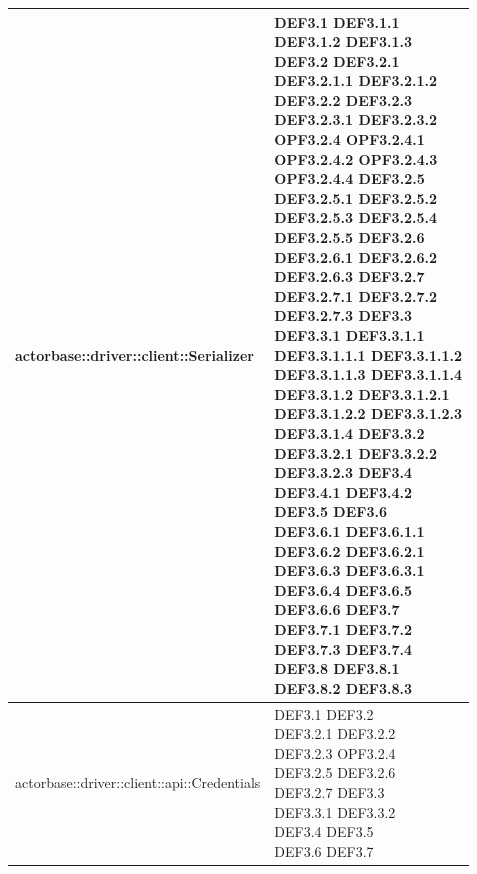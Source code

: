 \documentclass{scalatekids-article}
\begin{document}
\begin{longtable}[H]{|p{11.5cm}|p{5.5cm}|}
actorbase::driver::client::Serializer & \multiLineCell[t]{DEF3.1 DEF3.1.1\\DEF3.1.2 DEF3.1.3\\DEF3.2 DEF3.2.1\\DEF3.2.1.1 DEF3.2.1.2\\DEF3.2.2 DEF3.2.3\\DEF3.2.3.1 DEF3.2.3.2\\OPF3.2.4 OPF3.2.4.1\\OPF3.2.4.2 OPF3.2.4.3\\OPF3.2.4.4 DEF3.2.5\\DEF3.2.5.1 DEF3.2.5.2\\DEF3.2.5.3 DEF3.2.5.4\\DEF3.2.5.5 DEF3.2.6\\DEF3.2.6.1 DEF3.2.6.2\\DEF3.2.6.3 DEF3.2.7\\DEF3.2.7.1 DEF3.2.7.2\\DEF3.2.7.3 DEF3.3\\DEF3.3.1 DEF3.3.1.1\\DEF3.3.1.1.1 DEF3.3.1.1.2\\DEF3.3.1.1.3 DEF3.3.1.1.4\\DEF3.3.1.2 DEF3.3.1.2.1\\DEF3.3.1.2.2 DEF3.3.1.2.3\\DEF3.3.1.4 DEF3.3.2\\DEF3.3.2.1 DEF3.3.2.2\\DEF3.3.2.3 DEF3.4\\DEF3.4.1 DEF3.4.2\\DEF3.5 DEF3.6\\DEF3.6.1 DEF3.6.1.1\\DEF3.6.2 DEF3.6.2.1\\DEF3.6.3 DEF3.6.3.1\\DEF3.6.4 DEF3.6.5\\DEF3.6.6 DEF3.7\\DEF3.7.1 DEF3.7.2\\DEF3.7.3 DEF3.7.4\\DEF3.8 DEF3.8.1\\DEF3.8.2 DEF3.8.3\\}\\
\hline
actorbase::driver::client::api::Credentials & \multiLineCell[t]{DEF3.1 DEF3.2\\DEF3.2.1 DEF3.2.2\\DEF3.2.3 OPF3.2.4\\DEF3.2.5 DEF3.2.6\\DEF3.2.7 DEF3.3\\DEF3.3.1 DEF3.3.2\\DEF3.4 DEF3.5\\DEF3.6 DEF3.7\\}\\

\end{longtable}
\end{document}
